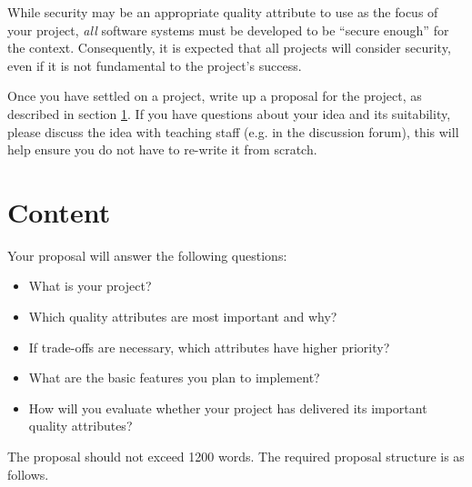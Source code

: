 \documentclass{csse4400}
\begin{document}
\noindent
While security may be an appropriate quality attribute to use as the focus of your project,
\textit{all} software systems must be developed to be ``secure enough'' for the context.
Consequently, it is expected that all projects will consider security,
even if it is not fundamental to the project's success.

Once you have settled on a project, write up a proposal for the project, as described in section \ref{sect:content}.
If you have questions about your idea and its suitability,
please discuss the idea with teaching staff (e.g. in the discussion forum),
this will help ensure you do not have to re-write it from scratch.


\section{Content}\label{sect:content}
Your proposal will answer the following questions:
\begin{itemize}
    \item What is your project?
    \item Which quality attributes are most important and why?
    \item If trade-offs are necessary, which attributes have higher priority?
    \item What are the basic features you plan to implement?
    \item How will you evaluate whether your project has delivered its important quality attributes?
\end{itemize}

\noindent
The proposal should not exceed 1200 words.
The required proposal structure is as follows.
\end{document}
